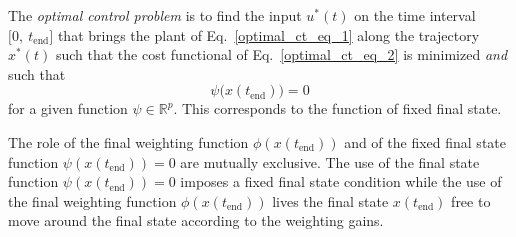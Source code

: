 \documentclass[11pt,a4paper,oneside]{book}
\numberwithin{equation}{section}
\theoremstyle{it}
\theoremstyle{definition}
\begin{document}
The \textit{optimal control problem} is to find the input $u^*(t)$ on the time 
interval $\big[0,\ t_{\text{end}}\big]$ that brings the plant of 
Eq.~\eqref{optimal_ct_eq_1} along the trajectory $x^*(t)$ such that the cost 
functional of Eq.~\eqref{optimal_ct_eq_2} is minimized \textit{and} such that 
\begin{equation}\label{optimal_ct_eq_3}
	\psi\big(x(t_{\text{end}})\big)=0
\end{equation}
for a given function $\psi\in\mathbb{R}^p$. This corresponds to the function of 
fixed final state.

The role of the final weighting function $\phi(x(t_{\text{end}}))$ and of the 
fixed final state function $\psi(x(t_{\text{end}}))=0$ are mutually exclusive. 
The use of the final state function $\psi(x(t_{\text{end}}))=0$ imposes a fixed 
final state condition while the use of the final weighting function 
$\phi(x(t_{\text{end}}))$ lives the final state $x(t_{\text{end}})$ free to 
move around the final state according to the weighting gains.
\end{document}
